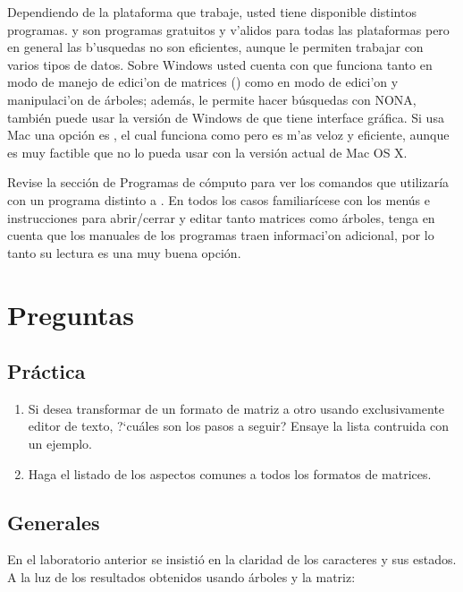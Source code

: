 Dependiendo de la plataforma que trabaje, usted tiene disponible distintos programas.  y   son programas gratuitos y v'alidos para todas las plataformas pero en general las b'usquedas no son eficientes, aunque le permiten trabajar con varios tipos de datos. Sobre Windows usted cuenta con  que funciona tanto en modo de manejo de edici'on de matrices () como en modo de edici'on y manipulaci'on de \'arboles; adem\'as, le permite hacer b\'usquedas con NONA, tambi\'en puede usar la versi\'on de Windows de  que tiene interface gr\'afica. Si usa Mac una opci\'on es , el cual funciona como  pero es m'as veloz y eficiente, aunque es muy factible que no lo pueda usar con la versi\'on actual de Mac OS X.


Revise la secci\'on de Programas de c\'omputo para ver los comandos que utilizar\'ia con un programa distinto a . En todos los casos familiar\'icese con los men\'us e instrucciones para abrir/cerrar y editar tanto matrices como \'arboles, tenga en cuenta que los manuales de los programas traen informaci'on adicional, por lo tanto su lectura es una muy buena opci\'on.


\section*{Preguntas} 

\subsection*{Pr\'actica} 

\begin{enumerate}

	\item Si desea transformar de un formato de matriz a otro usando exclusivamente editor de texto, ?`cu\'ales son los pasos a seguir? Ensaye la lista contruida con un ejemplo.

	\item Haga el listado de los aspectos comunes a todos los formatos de matrices.
\end{enumerate}


\subsection*{Generales} 

En el laboratorio anterior se insisti\'o en la claridad de los caracteres y sus estados. A la luz de los resultados obtenidos usando \'arboles y la matriz:

